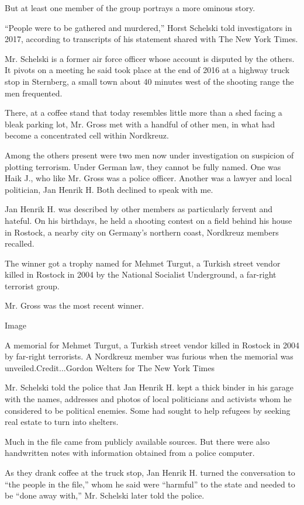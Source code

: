 But at least one member of the group portrays a more ominous story.

``People were to be gathered and murdered,'' Horst Schelski told
investigators in 2017, according to transcripts of his statement shared
with The New York Times.

Mr. Schelski is a former air force officer whose account is disputed by
the others. It pivots on a meeting he said took place at the end of 2016
at a highway truck stop in Sternberg, a small town about 40 minutes west
of the shooting range the men frequented.

There, at a coffee stand that today resembles little more than a shed
facing a bleak parking lot, Mr. Gross met with a handful of other men,
in what had become a concentrated cell within Nordkreuz.

Among the others present were two men now under investigation on
suspicion of plotting terrorism. Under German law, they cannot be fully
named. One was Haik J., who like Mr. Gross was a police officer. Another
was a lawyer and local politician, Jan Henrik H. Both declined to speak
with me.

Jan Henrik H. was described by other members as particularly fervent and
hateful. On his birthdays, he held a shooting contest on a field behind
his house in Rostock, a nearby city on Germany's northern coast,
Nordkreuz members recalled.

The winner got a trophy named for Mehmet Turgut, a Turkish street vendor
killed in Rostock in 2004 by the National Socialist Underground, a
far-right terrorist group.

Mr. Gross was the most recent winner.

Image

A memorial for Mehmet Turgut, a Turkish street vendor killed in Rostock
in 2004 by far-right terrorists. A Nordkreuz member was furious when the
memorial was unveiled.Credit...Gordon Welters for The New York Times

Mr. Schelski told the police that Jan Henrik H. kept a thick binder in
his garage with the names, addresses and photos of local politicians and
activists whom he considered to be political enemies. Some had sought to
help refugees by seeking real estate to turn into shelters.

Much in the file came from publicly available sources. But there were
also handwritten notes with information obtained from a police computer.

As they drank coffee at the truck stop, Jan Henrik H. turned the
conversation to ``the people in the file,'' whom he said were
``harmful'' to the state and needed to be ``done away with,'' Mr.
Schelski later told the police.

